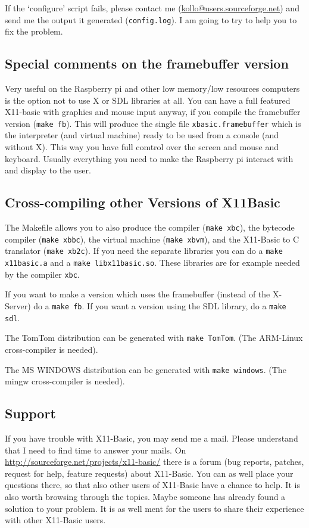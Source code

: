 If the `configure' script fails, please contact me
(\url{kollo@users.sourceforge.net}) and send me the output it generated
(\verb|config.log|). I am going to try to help you to fix the problem.

\subsection*{Special comments on the framebuffer version}

Very useful on the Raspberry pi and other low memory/low resources computers 
is the option not to use X or SDL libraries at all. You can have a full 
featured X11-basic with graphics and mouse input anyway, if you compile the 
framebuffer version (\verb|make fb|). This will produce the single file 
\verb|xbasic.framebuffer| which is the interpreter (and virtual machine) 
ready to be used from a console (and without X). This way you have full comtrol 
over the screen and mouse and keyboard. Usually everything you need to make the 
Raspberry pi interact with and display to the user. 

\subsection*{Cross-compiling other Versions of X11Basic}

The Makefile allows you to also produce the compiler (\verb|make xbc|),  the
bytecode compiler (\verb|make xbbc|), the virtual  machine (\verb|make xbvm|),
and the X11-Basic to C translator (\verb|make xb2c|). If you  need the separate
libraries you can do a \verb|make x11basic.a| and a \verb|make libx11basic.so|.
These libraries are for example needed by the compiler \verb|xbc|. 

If you want to make a version which uses the framebuffer (instead of the
X-Server) do a \verb|make fb|. If you want a version using the SDL library, do a
\verb|make sdl|.

The TomTom distribution can be generated with \verb|make TomTom|. (The ARM-Linux
cross-compiler is needed).

The MS WINDOWS distribution can be generated with \verb|make windows|. (The
mingw cross-compiler is needed).


\subsection*{Support}

If you have trouble with X11-Basic, you may send me a mail. Please understand
that I need to find time to answer your mails. On 
\url{http://sourceforge.net/projects/x11-basic/} there is a forum (bug reports,
patches, request for help, feature requests) about X11-Basic. You can as well
place your questions there, so that also other users of X11-Basic have a chance
to help. It is also worth browsing through the topics. Maybe someone has already
found a solution to your problem. It is as well ment for the users to
share their experience with other X11-Basic users.

